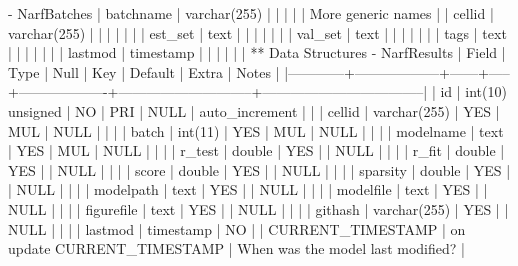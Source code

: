 {{   - NarfBatches
     | batchname     | varchar(255) |   |   |   |   | More generic names                                   |
     | cellid        | varchar(255) |   |   |   |   |                                                      |
     | est_set       | text         |   |   |   |   |                                                      |
     | val_set       | text         |   |   |   |   |                                                      |
     | tags          | text         |   |   |   |   |                                                      |
     | lastmod       | timestamp    |   |   |   |   |                                                      |
** Data Structures
   - NarfResults
     | Field      | Type             | Null | Key | Default           | Extra                       | Notes                             |
     |------------+------------------+------+-----+-------------------+-----------------------------+-----------------------------------|
     | id         | int(10) unsigned | NO   | PRI | NULL              | auto_increment              |                                   |
     | cellid     | varchar(255)     | YES  | MUL | NULL              |                             |                                   |
     | batch      | int(11)          | YES  | MUL | NULL              |                             |                                   |
     | modelname  | text             | YES  | MUL | NULL              |                             |                                   |
     | r_test     | double           | YES  |     | NULL              |                             |                                   |
     | r_fit      | double           | YES  |     | NULL              |                             |                                   |
     | score      | double           | YES  |     | NULL              |                             |                                   |
     | sparsity   | double           | YES  |     | NULL              |                             |                                   |
     | modelpath  | text             | YES  |     | NULL              |                             |                                   |
     | modelfile  | text             | YES  |     | NULL              |                             |                                   |
     | figurefile | text             | YES  |     | NULL              |                             |                                   |
     | githash    | varchar(255)     | YES  |     | NULL              |                             |                                   |
     | lastmod    | timestamp        | NO   |     | CURRENT_TIMESTAMP | on update CURRENT_TIMESTAMP | When was the model last modified? |
     
}}

